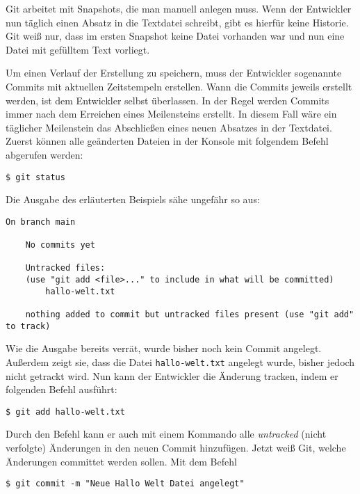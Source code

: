 Git arbeitet mit Snapshots, die man manuell anlegen muss. Wenn der Entwickler
nun täglich einen Absatz in die Textdatei schreibt, gibt es hierfür keine
Historie. Git weiß nur, dass im ersten Snapshot keine Datei vorhanden war und
nun eine Datei mit gefülltem Text vorliegt.

Um einen Verlauf der Erstellung zu speichern, muss der Entwickler sogenannte
Commits mit aktuellen Zeitstempeln erstellen. Wann die Commits jeweils erstellt
werden, ist dem Entwickler selbst überlassen. In der Regel werden Commits immer
nach dem Erreichen eines Meilensteins erstellt. In diesem Fall wäre ein
täglicher Meilenstein das Abschließen eines neuen Absatzes in der Textdatei.
Zuerst können alle geänderten Dateien in der Konsole mit folgendem Befehl
abgerufen werden:

\begin{lstlisting}[style=Bash]
    $ git status
\end{lstlisting}

\newpage
Die Ausgabe des erläuterten Beispiels sähe ungefähr so aus:

\begin{lstlisting}[style=Bash]
    On branch main

    No commits yet

    Untracked files:
    (use "git add <file>..." to include in what will be committed)
        hallo-welt.txt

    nothing added to commit but untracked files present (use "git add" to track)
\end{lstlisting}

Wie die Ausgabe bereits verrät, wurde bisher noch kein Commit angelegt. Außerdem
zeigt sie, dass die Datei \texttt{hallo-welt.txt} angelegt wurde, bisher jedoch
nicht getrackt wird. Nun kann der Entwickler die Änderung tracken, indem er
folgenden Befehl ausführt:

\begin{lstlisting}[style=Bash]
    $ git add hallo-welt.txt
\end{lstlisting}

Durch den Befehl  kann er auch mit einem Kommando alle
\emph{untracked} (nicht verfolgte) Änderungen in den neuen Commit hinzufügen.
Jetzt weiß Git, welche Änderungen committet werden sollen. Mit dem Befehl

\begin{lstlisting}[style=Bash]
    $ git commit -m "Neue Hallo Welt Datei angelegt"
\end{lstlisting}

